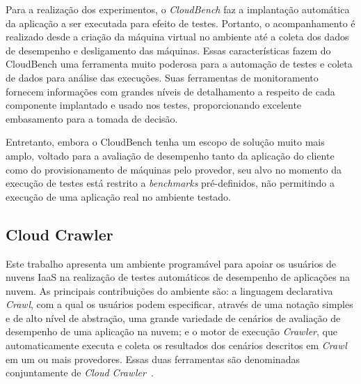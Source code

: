 Para a realização dos experimentos, o \textit{CloudBench} faz a implantação automática da aplicação a ser executada para efeito de testes. Portanto, o acompanhamento é realizado desde a criação da máquina virtual no ambiente até a coleta dos dados de desempenho e desligamento das máquinas. Essas características fazem do CloudBench uma ferramenta muito poderosa para a
automação de testes e coleta de dados para análise das execuções. Suas ferramentas
de monitoramento fornecem informações com grandes níveis de detalhamento a respeito
de cada componente implantado e usado nos testes, proporcionando excelente embasamento
para a tomada de decisão.

Entretanto, embora o CloudBench tenha um escopo de solução muito mais amplo, 
voltado para a avaliação de desempenho tanto da aplicação do cliente como do 
provisionamento de máquinas pelo provedor, seu alvo no momento da execução de 
testes está restrito a \textit{benchmarks} pré-definidos, não permitindo a execução de 
uma aplicação real no ambiente testado.


\subsection{Cloud Crawler}
Este trabalho apresenta um ambiente programável para apoiar os usuários de nuvens IaaS na realização de testes automáticos de desempenho de aplicações na nuvem. As principais contribuições do ambiente são: a linguagem declarativa {\em Crawl}, com a qual os usuários podem especificar, através de uma notação simples e de alto nível de abstração, uma grande variedade de cenários de avaliação de desempenho de uma aplicação na nuvem; e o motor de execução {\em Crawler}, que automaticamente executa e coleta os resultados dos cenários descritos em {\em Crawl} em um ou mais provedores. Essas duas ferramentas são denominadas conjuntamente de {\em Cloud Crawler}~\cite{cunhacloud}.

